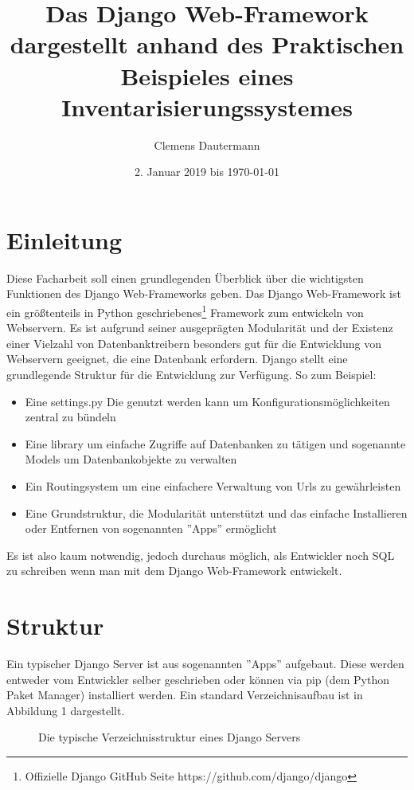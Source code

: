 \documentclass{article}
\title{Das Django Web-Framework dargestellt anhand des Praktischen Beispieles eines Inventarisierungssystemes}
\author{Clemens Dautermann}
\date{2. Januar 2019 bis \today}
\begin{document}
\maketitle
\newpage
\tableofcontents
\newpage


\section{Einleitung}
Diese Facharbeit soll einen grundlegenden Überblick über die wichtigsten Funktionen des Django Web-Frameworks geben.\newline
Das Django Web-Framework ist ein größtenteils in Python geschriebenes\footnote{Offizielle Django GitHub Seite https://github.com/django/django} Framework
zum entwickeln von Webservern. Es ist aufgrund seiner ausgeprägten Modularität und der Existenz einer Vielzahl von Datenbanktreibern besonders gut für
die Entwicklung von Webservern geeignet, die eine Datenbank erfordern.\newline 
Django stellt eine grundlegende Struktur für die Entwicklung zur Verfügung. So zum Beispiel:
\begin{itemize}
	\item Eine settings.py Die genutzt werden kann um Konfigurationsmöglichkeiten zentral zu bündeln
	\item Eine library um einfache Zugriffe auf Datenbanken zu tätigen und sogenannte Models um Datenbankobjekte zu verwalten
	\item Ein Routingsystem um eine einfachere Verwaltung von Urls zu gewährleisten
	\item Eine Grundstruktur, die Modularität unterstützt und das einfache Installieren oder Entfernen von sogenannten ''Apps'' ermöglicht
\end{itemize}
Es ist also kaum notwendig, jedoch durchaus möglich, als Entwickler noch SQL zu schreiben wenn man mit dem Django Web-Framework entwickelt.

\section{Struktur}
Ein typischer Django Server ist aus sogenannten ''Apps'' aufgebaut. Diese werden entweder vom Entwickler selber geschrieben oder können via pip (dem Python Paket Manager) installiert werden. Ein standard Verzeichnisaufbau ist in Abbildung 1 dargestellt.
\newpage
\begin{figure}[H]
	\caption{Die typische Verzeichnisstruktur eines Django Servers}
\end{figure}
\end{document}
